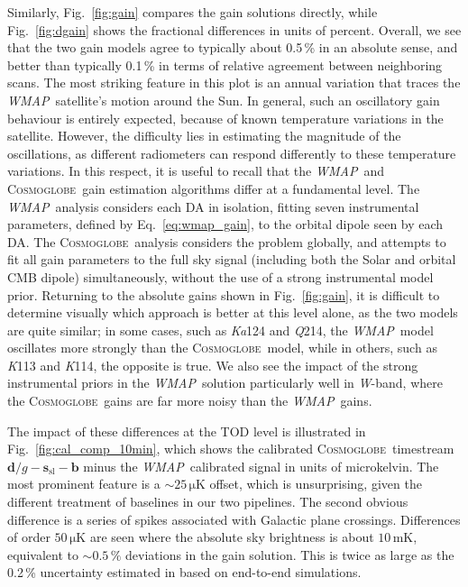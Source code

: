 \documentclass[twocolumn]{../../common/aa}
\def\WMAP{\emph{WMAP}}
\newcommand{\cosmoglobe}{\textsc{Cosmoglobe}}
\newcommand{\K}[0]{\textit K}
\newcommand{\Ka}[0]{\textit{Ka}}
\newcommand{\Q}[0]{\textit Q}
\newcommand{\W}[0]{\textit W}
\begin{document}
Similarly, Fig.~\ref{fig:gain} compares the gain solutions directly, while Fig.~\ref{fig:dgain} shows the fractional differences in units of percent. Overall, we see that the two gain models agree to typically about 0.5\,\% in an absolute sense, and better than typically 0.1\,\% in terms of relative agreement between neighboring scans. The most striking feature in this plot is an annual variation that traces the \WMAP\ satellite's motion around the Sun. In general, such an oscillatory gain behaviour is entirely expected, because of known temperature variations in the satellite. However, the difficulty lies in estimating the magnitude of the oscillations, as different radiometers can respond differently to these temperature variations. In this respect, it is useful to recall that the \WMAP\ and \cosmoglobe\ gain estimation algorithms differ at a fundamental level. The \WMAP\ analysis considers each DA in isolation, fitting seven instrumental parameters, defined by Eq.~\eqref{eq:wmap_gain}, to the orbital dipole seen by each DA. The \cosmoglobe\ analysis considers the problem globally, and attempts to fit all gain parameters to the full sky signal (including both the Solar and orbital CMB dipole) simultaneously, without the use of a strong instrumental model prior. Returning to the absolute gains shown in Fig.~\ref{fig:gain}, it is difficult to determine visually which approach is better at this level alone, as the two models are quite similar; in some cases, such as \Ka124 and \Q214, the \WMAP\ model oscillates more strongly than the \cosmoglobe\ model, while in others, such as \K113 and \K114, the opposite is true. We also see the impact of the strong instrumental priors in the \WMAP\ solution particularly well in \W-band, where the \cosmoglobe\ gains are far more noisy than the \WMAP\ gains. 


The impact of these differences at the TOD level is illustrated in Fig.~\ref{fig:cal_comp_10min}, which shows the calibrated \cosmoglobe\ timestream $\boldsymbol d/g-\boldsymbol s_\mathrm{sl}-\boldsymbol b$ minus the \WMAP\ calibrated signal in units of microkelvin. The most prominent feature is a $\sim25\,\mathrm{\mu K}$ offset, which is unsurprising, given the different treatment of baselines in our two pipelines. The second obvious difference is a series of spikes associated with Galactic plane crossings. Differences of order $50\,\mathrm{\mu K}$ are seen where the absolute sky brightness is about $10\,\mathrm{mK}$, equivalent to $\sim0.5\,\%$ deviations in the gain solution. This is twice as large as the 0.2\,\% uncertainty estimated in \citet{bennett2012} based on end-to-end simulations.
\end{document}
